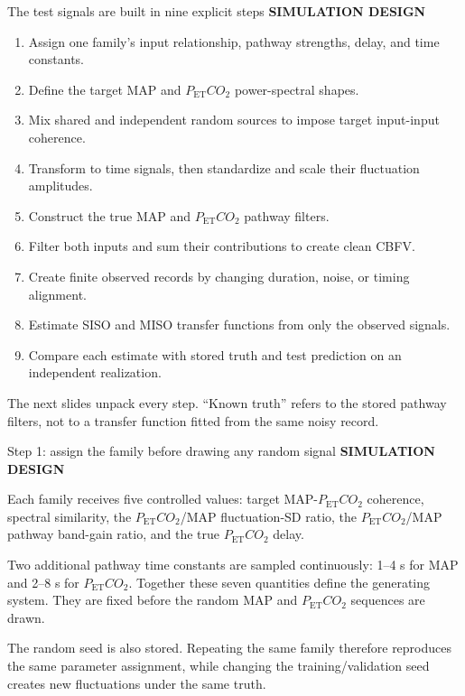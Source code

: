 \documentclass[aspectratio=169,11pt]{beamer}
\newcommand{\PETCOtwo}{P_{\mathrm{ET}}CO_2}
\newcommand{\sectionlabel}[1]{%
  {\color{Accent}\fontsize{8}{9.5}\selectfont\bfseries\MakeUppercase{#1}}\par\vspace{0.12cm}}
\begin{document}
\begin{frame}{The test signals are built in nine explicit steps}
\sectionlabel{Simulation Design}
\fontsize{9.4}{11.6}\selectfont
\begin{enumerate}
  \item Assign one family's input relationship, pathway strengths, delay, and time constants.
  \item Define the target MAP and $\PETCOtwo$ power-spectral shapes.
  \item Mix shared and independent random sources to impose target input-input coherence.
  \item Transform to time signals, then standardize and scale their fluctuation amplitudes.
  \item Construct the true MAP and $\PETCOtwo$ pathway filters.
  \item Filter both inputs and sum their contributions to create clean CBFV.
  \item Create finite observed records by changing duration, noise, or timing alignment.
  \item Estimate SISO and MISO transfer functions from only the observed signals.
  \item Compare each estimate with stored truth and test prediction on an independent realization.
\end{enumerate}

\vspace{0.12cm}
The next slides unpack every step. ``Known truth'' refers to the stored pathway
filters, not to a transfer function fitted from the same noisy record.
\end{frame}

\begin{frame}{Step 1: assign the family before drawing any random signal}
\sectionlabel{Simulation Design}
Each family receives five controlled values: target MAP-$\PETCOtwo$ coherence,
spectral similarity, the $\PETCOtwo$/MAP fluctuation-SD ratio, the
$\PETCOtwo$/MAP pathway band-gain ratio, and the true $\PETCOtwo$ delay.

\vspace{0.35cm}
Two additional pathway time constants are sampled continuously: 1--4 s for MAP
and 2--8 s for $\PETCOtwo$. Together these seven quantities define the generating
system. They are fixed before the random MAP and $\PETCOtwo$ sequences are drawn.

\vspace{0.35cm}
The random seed is also stored. Repeating the same family therefore reproduces
the same parameter assignment, while changing the training/validation seed
creates new fluctuations under the same truth.
\end{frame}
\end{document}
